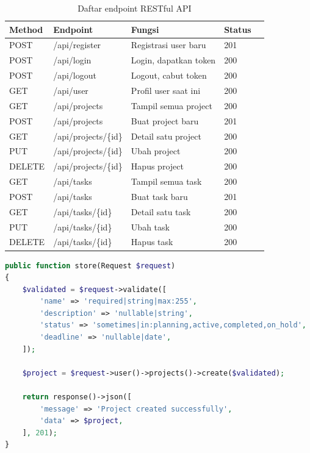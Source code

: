 \documentclass[12pt,letterpaper]{report}
\begin{document}
\begin{table}[H]
\centering
\begin{tabular}{lllll}
\toprule
\textbf{Method} & \textbf{Endpoint} & \textbf{Fungsi} & \textbf{Status} \\
\midrule
POST   & /api/register         & Registrasi user baru      & 201 \\
POST   & /api/login            & Login, dapatkan token      & 200 \\
POST   & /api/logout           & Logout, cabut token        & 200 \\
GET    & /api/user             & Profil user saat ini       & 200 \\
\midrule
GET    & /api/projects         & Tampil semua project       & 200 \\
POST   & /api/projects         & Buat project baru          & 201 \\
GET    & /api/projects/\{id\}  & Detail satu project        & 200 \\
PUT    & /api/projects/\{id\}  & Ubah project               & 200 \\
DELETE & /api/projects/\{id\}  & Hapus project              & 200 \\
\midrule
GET    & /api/tasks            & Tampil semua task          & 200 \\
POST   & /api/tasks            & Buat task baru             & 201 \\
GET    & /api/tasks/\{id\}     & Detail satu task           & 200 \\
PUT    & /api/tasks/\{id\}     & Ubah task                  & 200 \\
DELETE & /api/tasks/\{id\}     & Hapus task                 & 200 \\
\bottomrule
\end{tabular}
\caption{Daftar endpoint RESTful API}
\end{table}

\begin{lstlisting}[language=php,caption={Potongan kode ProjectController -- store}]
public function store(Request $request)
{
    $validated = $request->validate([
        'name' => 'required|string|max:255',
        'description' => 'nullable|string',
        'status' => 'sometimes|in:planning,active,completed,on_hold',
        'deadline' => 'nullable|date',
    ]);

    $project = $request->user()->projects()->create($validated);

    return response()->json([
        'message' => 'Project created successfully',
        'data' => $project,
    ], 201);
}
\end{lstlisting}
\end{document}
